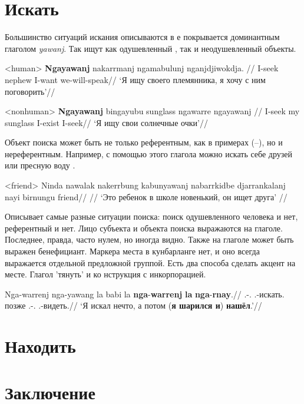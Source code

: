 
\section{Искать}
Большинство ситуаций искания описываются в  е покрывается доминантным глаголом \textit{yawanj}. Так ищут как одушевленный , так и неодушевленный  объекты.

\ex<human> \begingl
\gla \textbf{Ngayawanj} nakarrmanj ngamabulunj nganjdjiwokdja. //
\glb I-seek nephew I-want we-will-speak//
\glft `Я ищу своего племянника, я хочу с ним поговорить'//
\endgl \xe

\ex<nonhuman> \begingl
\gla \textbf{Ngayawanj} bingayubu sunglass ngawarre ngayawanj //
\glb I-seek my sunglass I-exist I-seek//
\glft `Я ищу свои солнечные очки'//
\endgl \xe

Объект поиска может быть не только референтным, как в примерах (--), но и нереферентным. Например, с помощью этого глагола можно искать себе друзей  или пресную воду .

\ex<friend> \begingl
\gla Ninda nawalak nakerrbung kabunyawanj nabarrkidbe djarrankalanj nayi birnungu friend//
\glb //
\glft `Это ребенок в школе новенький, он ищет друга' //
\endgl \xe






Описывает самые разные ситуации поиска: поиск одушевленного человека и нет, референтный и нет. Лицо субъекта и объекта поиска выражаются на глаголе. Последнее, правда, часто нулем, но иногда видно. Также на глаголе может быть выражен бенефициант. Маркера места в кунбарланге нет, и оно всегда выражается отдельной предложной группой. 
Есть два способа сделать акцент на месте. Глагол 'тянуть' и ко  нструкция с инкорпорацией.

\begingl
\gla Nga-warrenj nga-yawang la babi la \textbf{nga}-\textbf{warrenj} \textbf{la} \textbf{nga}-\textbf{rnay}.//
\glb \Fsg.\Real-\warre.\Pst{} \Fsg.\Real-искать.\Pst{} \la{} позже \la{} \Fsg.\Real-\warre.\Pst{} \la{} \Fsg.\Real-видеть.\Pst{}//
\glft `Я искал нечто, а потом (\textbf{я шарился и}) \textbf{ нашёл}.'\trailingcitation{[IK1-170610\_1SY-02/54:02--10]}//
\endgl\xe

\section{Находить}

\section{Заключение}

